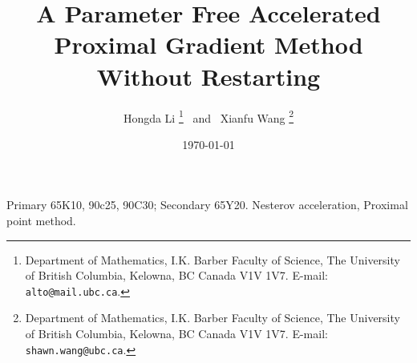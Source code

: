 \documentclass[12pt]{article}
\begin{document}
\title{{\selectfont 
        A Parameter Free Accelerated Proximal Gradient Method Without Restarting
    }}

\author{
    Hongda Li
    \thanks{Department of Mathematics, I.K. Barber Faculty of Science,
    The University of British Columbia, Kelowna, BC Canada V1V 1V7. E-mail:  \texttt{alto@mail.ubc.ca}.}~ and ~Xianfu Wang
    \thanks{Department of Mathematics, I.K. Barber Faculty of Science,
    The University of British Columbia, Kelowna, BC Canada V1V 1V7. E-mail:  \texttt{shawn.wang@ubc.ca}.}
}

\date{\today}

\maketitle


\begin{abstract} 
    \noindent
    
    \cite{nesterov_lectures_2018}
\end{abstract}

Primary 65K10, 90c25, 90C30; Secondary 65Y20. 
 Nesterov acceleration, Proximal point method. 
\end{document}

